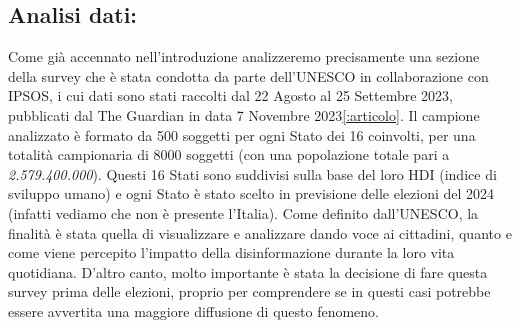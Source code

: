 \documentclass{article}
\begin{document}
\newpage\centering\subsection{Analisi dati:}

\begin{justify}    
Come già accennato nell'introduzione analizzeremo precisamente una sezione della survey che è stata condotta da parte dell'UNESCO in collaborazione con IPSOS, i cui dati sono stati raccolti dal 22 Agosto al 25 Settembre 2023, pubblicati dal The Guardian in data 7 Novembre 2023\ref{:articolo}. \citep{Unesco}
Il campione analizzato è formato da 500 soggetti per ogni Stato dei 16 coinvolti, per una totalità campionaria di 8000 soggetti (con una popolazione totale pari a \textit{2.579.400.000}).
Questi 16 Stati sono suddivisi sulla base del loro HDI (indice di sviluppo umano) e ogni Stato è stato scelto in previsione delle elezioni del 2024 (infatti vediamo che non è presente l'Italia).
Come definito dall'UNESCO, la finalità è stata quella di visualizzare e analizzare dando voce ai cittadini, quanto e come viene percepito l'impatto della disinformazione durante la loro vita quotidiana. D'altro canto, molto importante è stata la decisione di fare questa survey prima delle elezioni, proprio per comprendere se in questi casi potrebbe essere avvertita una maggiore diffusione di questo fenomeno.
\end{justify}
\end{document}

